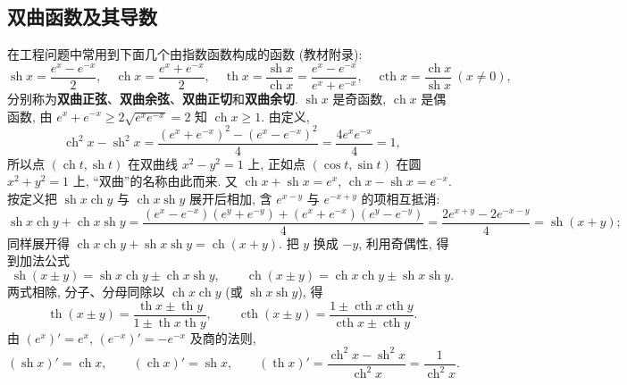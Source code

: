 \documentclass[UTF8,openany]{ctexbook}
\theoremstyle{chinesetextbook}
\begin{document}
\subsection{双曲函数及其导数}
在工程问题中常用到下面几个由指数函数构成的函数 (教材附录):
\[
\operatorname{sh}x=\frac{e^x-e^{-x}}2,\quad\operatorname{ch}x=\frac{e^x+e^{-x}}2,\quad\operatorname{th}x=\frac{\operatorname{sh}x}{\operatorname{ch}x}=\frac{e^x-e^{-x}}{e^x+e^{-x}},\quad\operatorname{cth}x=\frac{\operatorname{ch}x}{\operatorname{sh}x}\ (x\ne0),
\]
分别称为\textbf{双曲正弦}、\textbf{双曲余弦}、\textbf{双曲正切}和\textbf{双曲余切}. $\operatorname{sh}x$ 是奇函数, $\operatorname{ch}x$ 是偶函数, 由 $e^x+e^{-x}\ge2\sqrt{e^xe^{-x}}=2$ 知 $\operatorname{ch}x\ge1$. 由定义,
\[
\operatorname{ch}^2x-\operatorname{sh}^2x=\frac{(e^x+e^{-x})^2-(e^x-e^{-x})^2}4=\frac{4e^xe^{-x}}4=1,
\]
所以点 $(\operatorname{ch}t,\operatorname{sh}t)$ 在双曲线 $x^2-y^2=1$ 上, 正如点 $(\cos t,\sin t)$ 在圆 $x^2+y^2=1$ 上, “双曲”的名称由此而来. 又 $\operatorname{ch}x+\operatorname{sh}x=e^x$, $\operatorname{ch}x-\operatorname{sh}x=e^{-x}$. 按定义把 $\operatorname{sh}x\operatorname{ch}y$ 与 $\operatorname{ch}x\operatorname{sh}y$ 展开后相加, 含 $e^{x-y}$ 与 $e^{-x+y}$ 的项相互抵消:
\[
\operatorname{sh}x\operatorname{ch}y+\operatorname{ch}x\operatorname{sh}y=\frac{(e^x-e^{-x})(e^y+e^{-y})+(e^x+e^{-x})(e^y-e^{-y})}4=\frac{2e^{x+y}-2e^{-x-y}}4=\operatorname{sh}(x+y);
\]
同样展开得 $\operatorname{ch}x\operatorname{ch}y+\operatorname{sh}x\operatorname{sh}y=\operatorname{ch}(x+y)$. 把 $y$ 换成 $-y$, 利用奇偶性, 得到加法公式
\[
\operatorname{sh}(x\pm y)=\operatorname{sh}x\operatorname{ch}y\pm\operatorname{ch}x\operatorname{sh}y,\qquad\operatorname{ch}(x\pm y)=\operatorname{ch}x\operatorname{ch}y\pm\operatorname{sh}x\operatorname{sh}y.
\]
两式相除, 分子、分母同除以 $\operatorname{ch}x\operatorname{ch}y$ (或 $\operatorname{sh}x\operatorname{sh}y$), 得
\[
\operatorname{th}(x\pm y)=\frac{\operatorname{th}x\pm\operatorname{th}y}{1\pm\operatorname{th}x\operatorname{th}y},\qquad\operatorname{cth}(x\pm y)=\frac{1\pm\operatorname{cth}x\operatorname{cth}y}{\operatorname{cth}x\pm\operatorname{cth}y}.
\]
由 $(e^x)'=e^x$, $(e^{-x})'=-e^{-x}$ 及商的法则,
\[
(\operatorname{sh}x)'=\operatorname{ch}x,\qquad(\operatorname{ch}x)'=\operatorname{sh}x,\qquad(\operatorname{th}x)'=\frac{\operatorname{ch}^2x-\operatorname{sh}^2x}{\operatorname{ch}^2x}=\frac1{\operatorname{ch}^2x}.
\]
\end{document}
